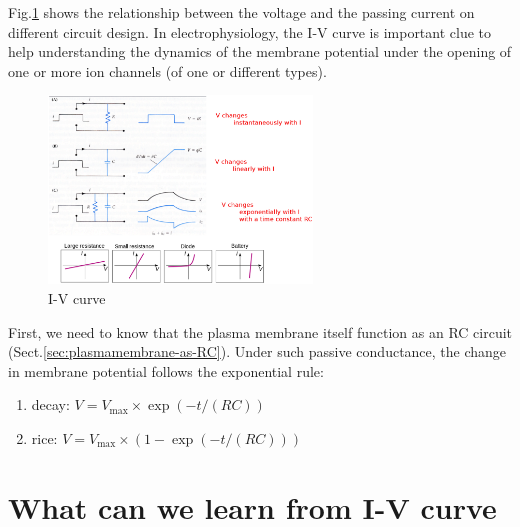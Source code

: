 Fig.\ref{fig:IV-curve} shows the relationship between the voltage and the
passing current on different circuit design. In electrophysiology, the I-V curve
is important clue to help understanding the dynamics of the membrane potential
under the opening of one or more ion channels (of one or different types).

\begin{figure}[hbt]
  \centerline{\includegraphics[height=5cm,
    angle=0]{./images/IV-curve.eps}}
\caption{I-V curve}
\label{fig:IV-curve}
\end{figure}

First, we need to know that the plasma membrane itself function as an RC
circuit (Sect.\ref{sec:plasmamembrane-as-RC}). Under such passive conductance,
the change in membrane potential follows the exponential rule:
\begin{enumerate}
  \item decay: $V = V_\max \times \exp(-t/(RC))$

  \item rice: $V = V_\max \times (1 - \exp(-t/(RC)))$
\end{enumerate}



\section{What can we learn from I-V curve}
\label{sec:I-V-curve-information}

